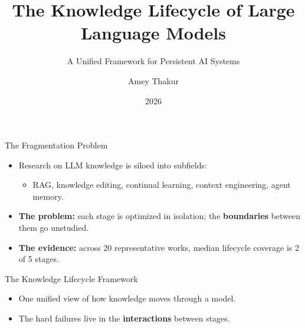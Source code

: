 \documentclass{beamer}
\title{The Knowledge Lifecycle of Large Language Models}
\subtitle{A Unified Framework for Persistent AI Systems}
\author{Amey Thakur}
\date{2026}
\begin{document}
\maketitle

\begin{frame}{The Fragmentation Problem}
  \begin{itemize}
    \item Research on LLM knowledge is siloed into subfields:
    \begin{itemize}
      \item RAG, knowledge editing, continual learning, context engineering, agent memory.
    \end{itemize}
    \item \textbf{The problem:} each stage is optimized in isolation; the \textbf{boundaries} between them go unstudied.
    \item \textbf{The evidence:} across 20 representative works, median lifecycle coverage is 2 of 5 stages.
  \end{itemize}
\end{frame}

\begin{frame}{The Knowledge Lifecycle Framework}
  \centering
  \vspace{0.3cm}
  \begin{itemize}
    \item One unified view of how knowledge moves through a model.
    \item The hard failures live in the \textbf{interactions} between stages.
  \end{itemize}
\end{frame}
\end{document}
